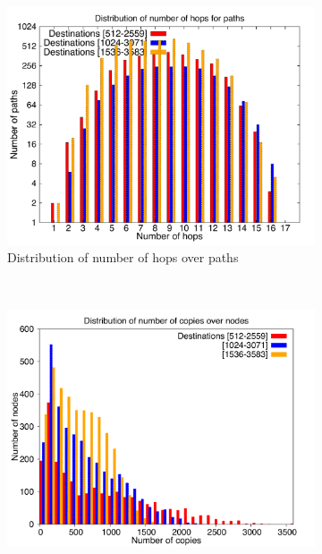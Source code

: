 \begin{figure}[!htbp]
        \centering
        \begin{subfigure}[b]{0.49\textwidth}
                \includegraphics[width=\textwidth]{report_figures/incrdist/4k/hop_histo.pdf}
                \caption{Distribution of number of hops over paths}
                \label{fig:incrdist_4k_hop}
        \end{subfigure}%
        ~ %
        \begin{subfigure}[b]{0.49\textwidth}
                \includegraphics[width=\textwidth]{report_figures/incrdist/4k/copy_histo.pdf}

\end{subfigure}
\end{figure}
